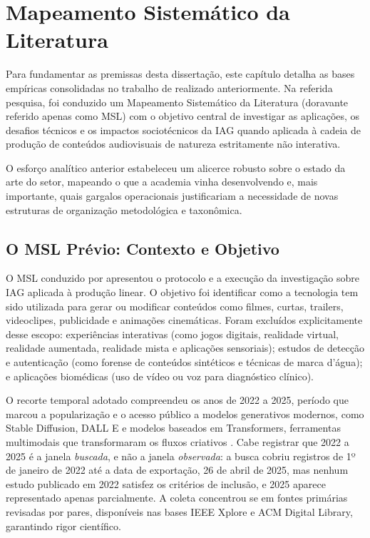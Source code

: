 \chapter{Mapeamento Sistemático da Literatura}
\label{cap_trabalhos_previos}

Para fundamentar as premissas desta dissertação, este capítulo detalha as bases empíricas consolidadas no trabalho de \citet{RothAleo2026} realizado anteriormente. Na referida pesquisa, foi conduzido um Mapeamento Sistemático da Literatura (doravante referido apenas como MSL) com o objetivo central de investigar as aplicações, os desafios técnicos e os impactos sociotécnicos da IAG quando aplicada à cadeia de produção de conteúdos audiovisuais de natureza estritamente não interativa. 

O esforço analítico anterior estabeleceu um alicerce robusto sobre o estado da arte do setor, mapeando o que a academia vinha desenvolvendo e, mais importante, quais gargalos operacionais justificariam a necessidade de novas estruturas de organização metodológica e taxonômica.

\section{O MSL Prévio: Contexto e Objetivo}

O MSL conduzido por \citet{RothAleo2026} apresentou o protocolo e a execução da investigação sobre IAG aplicada à produção linear. O objetivo foi identificar como a tecnologia tem sido utilizada para gerar ou modificar conteúdos como filmes, curtas, trailers, videoclipes, publicidade e animações cinemáticas. Foram excluídos explicitamente desse escopo: experiências interativas (como jogos digitais, realidade virtual, realidade aumentada, realidade mista e aplicações sensoriais); estudos de detecção e autenticação (como forense de conteúdos sintéticos e técnicas de marca d'água); e aplicações biomédicas (uso de vídeo ou voz para diagnóstico clínico).

O recorte temporal adotado compreendeu os anos de 2022 a 2025, período que marcou a popularização e o acesso público a modelos generativos modernos, como Stable Diffusion, DALL E e modelos baseados em Transformers, ferramentas multimodais que transformaram os fluxos criativos \citep{dwivedi2023chatgpt}. Cabe registrar que 2022 a 2025 é a janela \textit{buscada}, e não a janela \textit{observada}: a busca cobriu registros de 1º de janeiro de 2022 até a data de exportação, 26 de abril de 2025, mas nenhum estudo publicado em 2022 satisfez os critérios de inclusão, e 2025 aparece representado apenas parcialmente. A coleta concentrou se em fontes primárias revisadas por pares, disponíveis nas bases IEEE Xplore e ACM Digital Library, garantindo rigor científico.

